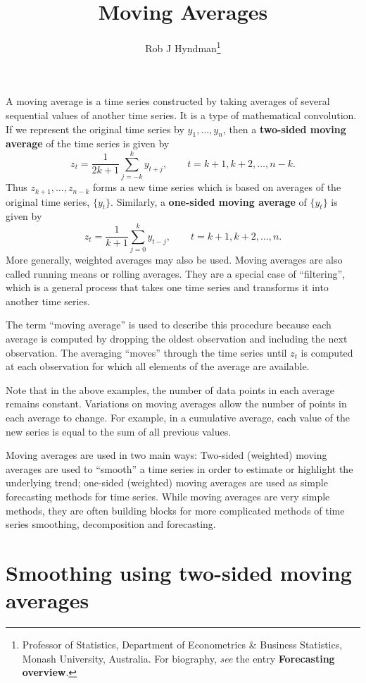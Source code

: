 \documentclass[a4paper,10pt]{article}
\begin{document}
\title{Moving Averages}
\author{Rob J Hyndman\footnote{Professor of Statistics, Department of Econometrics \& Business Statistics, Monash University, Australia. For biography, \textit{see} the entry \textbf{Forecasting overview}.}}
\date{}
\maketitle

A moving average is a time series constructed by taking averages of several sequential values of another time series. It is a type of mathematical convolution. If we represent the original time series by $y_1,\dots,y_n$, then a \textbf{two-sided moving average} of the time series is given by
\[
	z_t = \frac{1}{2k+1}\sum_{j=-k}^{k} y_{t+j}, \qquad t=k+1,k+2,\dots,n-k.
\]
Thus $z_{k+1},\dots,z_{n-k}$ forms a new time series which is based on averages of the original time series, $\{y_t\}$. Similarly, a \textbf{one-sided moving average} of $\{y_t\}$ is given by
\[
	z_t = \frac1{k+1}\sum_{j=0}^{k} y_{t-j}, \qquad t=k+1,k+2,\dots,n.
\]
More generally, weighted averages may also be used. Moving averages are also called running means or rolling averages. They are a special case of ``filtering'', which is a general process that takes one time series and transforms it into another time series.

The term ``moving average'' is used to describe this procedure because each average is computed by dropping the oldest observation and including the next observation. The averaging ``moves'' through the time series until $z_t$ is computed at each observation for which all elements of the average are available.

Note that in the above examples, the number of data points in each average remains constant. Variations on moving averages allow the number of points in each average to change. For example, in a cumulative average, each value of the new series is equal to the sum of all previous values.

Moving averages are used in two main ways: Two-sided (weighted) moving averages are used to ``smooth'' a time series in order to estimate or highlight the underlying trend; one-sided (weighted) moving averages are used as simple forecasting methods for time series. While moving averages are very simple methods, they are often building blocks for more complicated methods of time series smoothing, decomposition and forecasting.

\section{Smoothing using two-sided moving averages}
\end{document}
